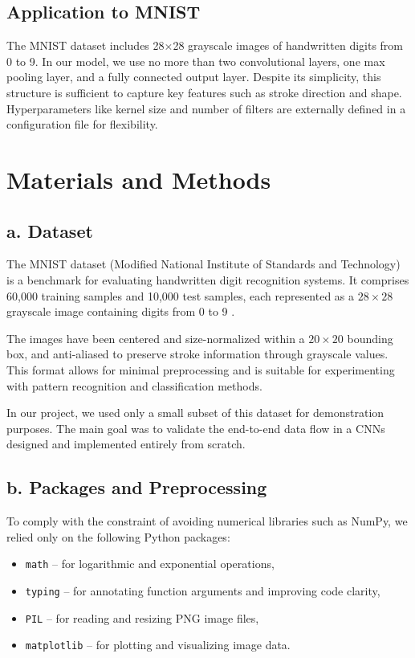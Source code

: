 \documentclass[conference]{IEEEtran}
\begin{document}
\subsection{Application to MNIST}
The MNIST dataset includes 28$\times$28 grayscale images of handwritten digits from 0 to 9. In our model, we use no more than two convolutional layers, one max pooling layer, and a fully connected output layer. Despite its simplicity, this structure is sufficient to capture key features such as stroke direction and shape. Hyperparameters like kernel size and number of filters are externally defined in a configuration file for flexibility.

\section{Materials and Methods}

\subsection*{a. Dataset}
The MNIST dataset (Modified National Institute of Standards and Technology) is a benchmark for evaluating handwritten digit recognition systems. It comprises 60,000 training samples and 10,000 test samples, each represented as a $28 \times 28$ grayscale image containing digits from 0 to 9 \cite{lecun2010mnist}.

The images have been centered and size-normalized within a $20 \times 20$ bounding box, and anti-aliased to preserve stroke information through grayscale values. This format allows for minimal preprocessing and is suitable for experimenting with pattern recognition and classification methods.

In our project, we used only a small subset of this dataset for demonstration purposes. The main goal was to validate the end-to-end data flow in a CNNs designed and implemented entirely from scratch.

\subsection*{b. Packages and Preprocessing}
To comply with the constraint of avoiding numerical libraries such as NumPy, we relied only on the following Python packages:
\begin{itemize}
    \item \texttt{math} – for logarithmic and exponential operations,
    \item \texttt{typing} – for annotating function arguments and improving code clarity,
    \item \texttt{PIL} – for reading and resizing PNG image files,
    \item \texttt{matplotlib} – for plotting and visualizing image data.
\end{itemize}
\end{document}
